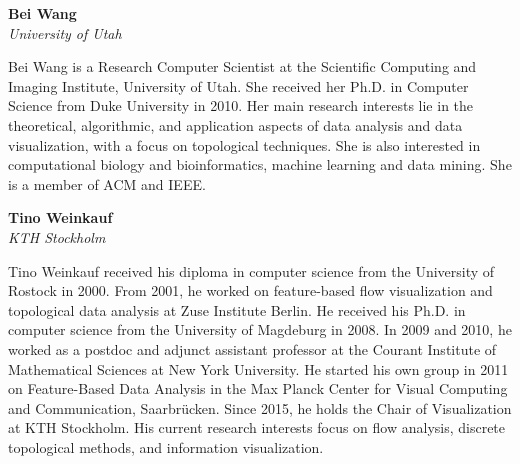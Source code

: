 \documentclass[preprint,journal]{vgtc}       %
\newcommand{\addverticalspace}{\vspace{3mm}}
\begin{document}
\noindent \textbf{Bei Wang}\\
\emph{University of Utah}

\addverticalspace
Bei Wang is a Research Computer Scientist at the Scientific Computing and Imaging Institute, University of Utah. She received her Ph.D. in Computer Science from Duke University in 2010. Her main research interests lie in the theoretical, algorithmic, and application aspects of data analysis and data visualization, with a focus on topological techniques. She is also interested in computational biology and bioinformatics, machine learning and data mining. She is a member of ACM and IEEE.
\addverticalspace

\noindent \textbf{Tino Weinkauf}\\
\emph{KTH Stockholm}

\addverticalspace
Tino Weinkauf received his diploma in computer science from the University of Rostock in 2000. From 2001, he worked on feature-based flow visualization and topological data analysis at Zuse Institute Berlin. He received his Ph.D. in computer science from the University of Magdeburg in 2008. In 2009 and 2010, he worked as a postdoc and adjunct assistant professor at the Courant Institute of Mathematical Sciences at New York University. He started his own group in 2011 on Feature-Based Data Analysis in the Max Planck Center for Visual Computing and Communication, Saarbrücken. Since 2015, he holds the Chair of Visualization at KTH Stockholm. His current research interests focus on flow analysis, discrete topological methods, and information visualization.

\printbibliography[title={Relevant Publications},category=Weinkauf]


% 
% 
\end{document}
